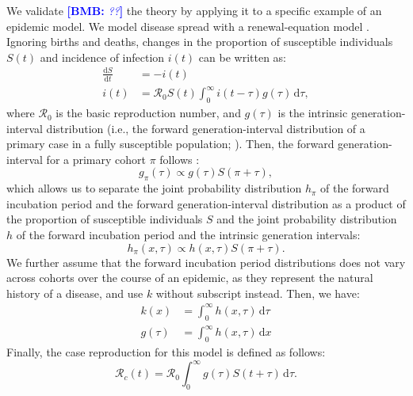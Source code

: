 \documentclass[12pt]{article}
\newcommand{\comment}{\showcomment}
\newcommand{\showcomment}[3]{\textcolor{#1}{\textbf{[#2: }\textsl{#3}\textbf{]}}}
\newcommand{\bmb}[1]{\comment{blue}{BMB}{#1}}
\newcommand{\Rx}[1]{\ensuremath{{\mathcal R}_{#1}}\xspace}
\newcommand{\Ro}{\Rx{0}}
\newcommand{\Rc}{\Rx{c}}
\newcommand{\dd}[1]{\ensuremath{\, \mathrm{d}#1}}
\newcommand{\dtau}{\dd{\tau}}
\newcommand{\dx}{\dd{x}}
\begin{document}
We validate \bmb{??} the theory by applying it to a specific example of an epidemic model. 
We model disease spread with a renewal-equation model \citep{heesterbeek1996concept, diekmann2000mathematical, roberts2004modelling, aldis2005integral, roberts2007model, champredon2018equivalence}.
Ignoring births and deaths, changes in the proportion of susceptible individuals $S(t)$ and incidence of infection $i(t)$ can be written as:
\begin{equation}
\begin{aligned}
\frac{\mathrm{d}S}{\mathrm{d}t} &= - i(t)\\
i(t) &= \Ro S(t) \int_0^\infty i(t-\tau) g(\tau) \dtau,
\end{aligned}
\label{eq:renewal}
\end{equation}
where \Ro is the basic reproduction number, and $g(\tau)$ is the intrinsic generation-interval distribution (i.e., the forward generation-interval distribution of a primary case in a fully susceptible population; \cite{champredon2015intrinsic}).
Then, the forward generation-interval for a primary cohort $\pi$ follows \citep{champredon2015intrinsic}:
\begin{equation}
g_\pi (\tau) \propto g(\tau) S(\pi + \tau),
\end{equation}
which allows us to separate the joint probability distribution $h_\pi$ of the forward incubation period and the forward generation-interval distribution as a product of the proportion of susceptible individuals $S$ and the joint probability distribution $h$ of the forward incubation period and the intrinsic generation intervals:
\begin{equation}
h_\pi (x, \tau) \propto h(x, \tau) S(\pi + \tau).
\end{equation}
We further assume that the forward incubation period distributions does not vary across cohorts over the course of an epidemic, as they represent the natural history of a disease, and use $k$ without subscript instead. 
Then, we have:
\begin{equation}
\begin{aligned}
k(x) &= \int_0^\infty h(x, \tau) \dtau\\
g(\tau) &= \int_0^\infty h(x, \tau) \dx
\end{aligned}
\end{equation}
Finally, the case reproduction for this model is defined as follows:
\begin{equation}
\Rc(t) = \Ro \int_0^\infty g(\tau) S(t+\tau) \dtau.
\end{equation}
\end{document}
